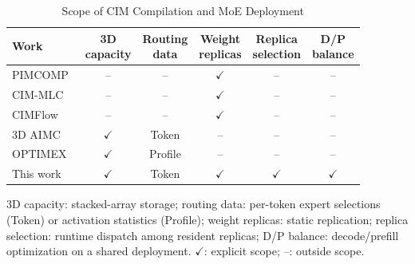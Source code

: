 \begin{table}[t]
  \caption{Scope of CIM Compilation and MoE Deployment}
  \label{tab:framework-comparison}
  \centering
  \footnotesize
  \begin{tabular*}{\columnwidth}{@{\extracolsep{\fill}}lccccc@{}}
    \hline
    Work & \shortstack{3D\\capacity} & \shortstack{Routing\\data} & \shortstack{Weight\\replicas} & \shortstack{Replica\\selection} & \shortstack{D/P\\balance} \\
    \hline
    PIMCOMP~\cite{pimcomp2023} & -- & -- & $\checkmark$ & -- & -- \\
    CIM-MLC~\cite{cimmlc2024} & -- & -- & $\checkmark$ & -- & -- \\
    CIMFlow~\cite{cimflow2025} & -- & -- & $\checkmark$ & -- & -- \\
    \hline
    3D AIMC~\cite{buchel2025} & $\checkmark$ & Token & -- & -- & -- \\
    OPTIMEX~\cite{sharma2025} & $\checkmark$ & Profile & -- & -- & -- \\
    \hline
    This work & $\checkmark$ & Token & $\checkmark$ & $\checkmark$ & $\checkmark$ \\
    \hline
  \end{tabular*}
  \par\smallskip
  \raggedright
  3D capacity: stacked-array storage; routing data: per-token expert selections (Token) or activation statistics (Profile); weight replicas: static replication; replica selection: runtime dispatch among resident replicas; D/P balance: decode/prefill optimization on a shared deployment. $\checkmark$: explicit scope; --: outside scope.
\end{table}
